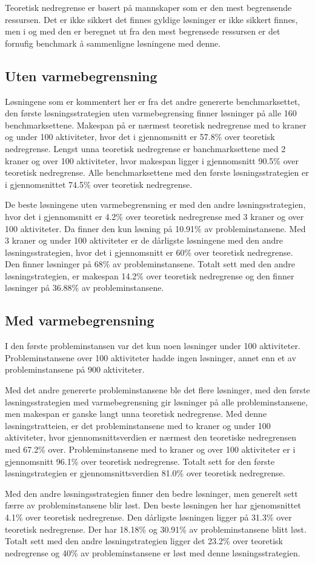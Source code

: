 Teoretisk nedregrense er basert på mannskaper som er den mest begrensende ressursen. Det er ikke sikkert det finnes gyldige løsninger er ikke sikkert finnes, men i og med den er beregnet ut fra den mest begrensede ressursen er det fornufig benchmark å sammenligne løsningene med denne.

\subsection{Uten varmebegrensning}
Løsningene som er kommentert her er fra det andre genererte benchmarksettet, den første løsningsstrategien uten varmebegrensing finner løsninger på alle 160 benchmarksettene. Makespan på er nærmest teoretisk nedregrense med to kraner og under 100 aktiviteter, hvor det i gjennomsnitt er 57.8\% over teoretisk nedregrense. Lengst unna teoretisk nedregrense er banchmarksettene med 2 kraner og over 100 aktiviteter, hvor makespan ligger i gjennomsnitt 90.5\% over teoretisk nedregrense. Alle benchmarksettene med den første løsningsstrategien er i gjennomsnittet 74.5\% over teoretisk nedregrense.

De beste løsningene uten varmebegrensning er med den andre løsningsstrategien, hvor det i gjennomsnitt er 4.2\% over teoretisk nedregrense med 3 kraner og over 100 aktiviteter. Da finner den kun løsning på 10.91\% av probleminstansene. Med 3 kraner og under 100 aktiviteter er de dårligste løsningene med den andre løsningsstrategien, hvor det i gjennomsnitt er 60\% over teoretisk nedregrense. Den finner løsninger på 68\% av probleminstansene. Totalt sett med den andre løsningstrategien, er makespan 14.2\% over teoretisk nedregrense og den finner løsninger på 36.88\% av probleminstansene.

\subsection{Med varmebegrensning}
I den første probleminstansen var det kun noen løsninger under 100 aktiviteter. Probleminstansene over 100 aktiviteter hadde ingen løsninger, annet enn et av probleminstansene på 900 aktiviteter.

Med det andre genererte probleminstansene ble det flere løsninger, med den første løsningsstrategien med varmebegrensning gir løsninger på alle probleminstansene, men makespan er ganske langt unna teoretisk nedregrense. Med denne løsningstratteien, er det probleminstansene med to kraner og under 100 aktiviteter, hvor gjennomsnittsverdien er nærmest den teoretiske nedregrensen med 67.2\% over. Probleminstansene med to kraner og over 100 aktiviteter er i gjennomsnitt 96.1\% over teoretisk nedregrense. Totalt sett for den første løsningstrategien er gjennomsnittsverdien 81.0\% over teoretisk nedregrense.

Med den andre løsningsstrategien finner den bedre løsninger, men generelt sett færre av probleminstansene blir løst. Den beste løsningen her har gjenomsnittet 4.1\% over teoretisk nedregrense. Den dårligste løsningen ligger på 31.3\% over teoretisk nedregrense. Der har 18.18\% og 30.91\% av probleminstansene blitt løst. Totalt sett med den andre løsningstrategien ligger det 23.2\% over teoretisk nedregrense og 40\% av probleminstansene er løst med denne løsningsstrategien.